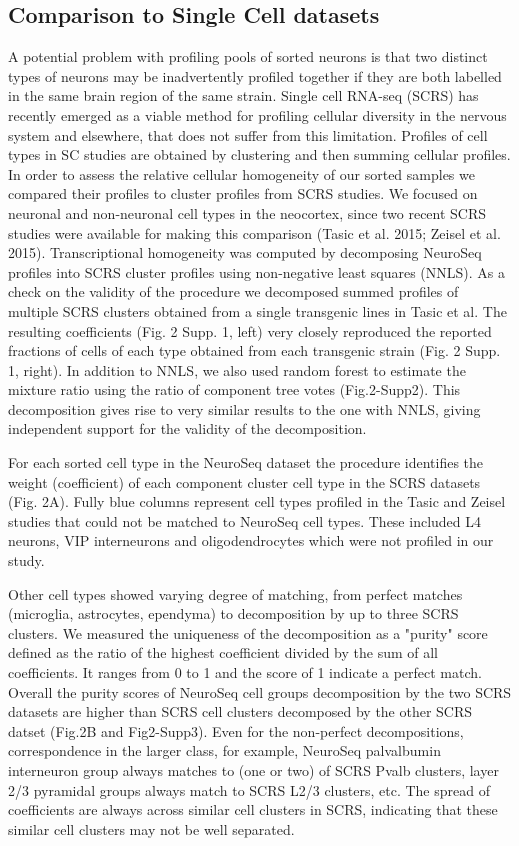 \subsection{Comparison to Single Cell datasets}
A potential problem with profiling pools of sorted neurons is that two distinct types of neurons may be inadvertently profiled together if they are both labelled in the same brain region of the same strain. Single cell RNA-seq (SCRS) has recently emerged as a viable method for profiling cellular diversity in the nervous system and elsewhere, that does not suffer from this limitation. Profiles of cell types in SC studies are obtained by clustering and then summing cellular profiles. In order to assess the relative cellular homogeneity of our sorted samples we compared their profiles to cluster profiles from SCRS studies. We focused on neuronal and non-neuronal cell types in the neocortex, since two recent SCRS studies were available for making this comparison (Tasic et al. 2015; Zeisel et al. 2015). Transcriptional homogeneity was computed by decomposing NeuroSeq profiles into SCRS cluster profiles using non-negative least squares (NNLS). As a check on the validity of the procedure we decomposed summed profiles of multiple SCRS clusters obtained from a single transgenic lines in Tasic et al. The resulting coefficients (Fig. 2 Supp. 1, left) very closely reproduced the reported fractions of cells of each type obtained from each transgenic strain (Fig. 2 Supp. 1, right). In addition to NNLS, we also used random forest to estimate the mixture ratio using the ratio of component tree votes (Fig.2-Supp2). This decomposition gives rise to very similar results to the one with NNLS, giving independent support for the validity of the decomposition. 

For each sorted cell type in the NeuroSeq dataset the procedure identifies the weight (coefficient) of each component cluster cell type in the SCRS datasets (Fig. 2A). Fully blue columns represent cell types profiled in the Tasic and Zeisel studies that could not be matched to NeuroSeq cell types. These included L4 neurons, VIP interneurons and oligodendrocytes which were not profiled in our study. 

Other cell types showed varying degree of matching, from perfect matches (microglia, astrocytes, ependyma) to decomposition by up to three SCRS clusters. We measured the uniqueness of the decomposition as a "purity" score defined as the ratio of the highest coefficient divided by the sum of all coefficients. It ranges from 0 to 1 and the score of 1 indicate a perfect match. Overall the purity scores of NeuroSeq cell groups decomposition by the two SCRS datasets are higher than SCRS cell clusters decomposed by the other SCRS datset (Fig.2B and Fig2-Supp3). Even for the non-perfect decompositions, correspondence in the larger class, for example, NeuroSeq palvalbumin interneuron group always matches to (one or two) of SCRS Pvalb clusters, layer 2/3 pyramidal groups always match to SCRS L2/3 clusters, etc. The spread of coefficients are always across similar cell clusters in SCRS, indicating that these similar cell clusters may not be well separated. 

